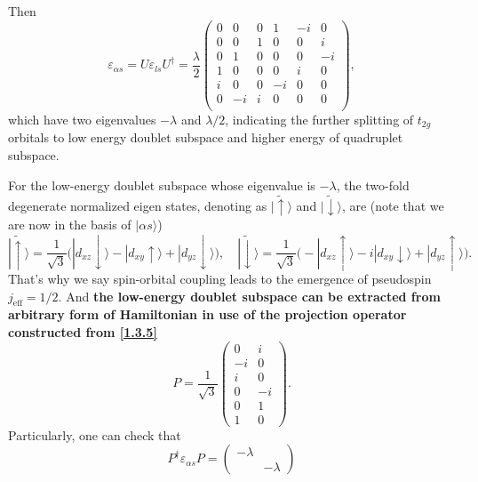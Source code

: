 \documentclass[10pt,nofootinbib]{revtex4}
\begin{document}
		Then
		\begin{equation}\label{1.3.4}
			\varepsilon_{\alpha s}=U \varepsilon_{ls} U^\dagger=
				\dfrac{\lambda}{2}\left(\begin{array}{cccccc}
					 0 & 0 & 0 & 1 & -i & 0 \\
					 0 & 0 & 1 & 0 & 0 & i \\
					 0 & 1 & 0 & 0 & 0 & -i \\
					 1 & 0 & 0 & 0 & i & 0 \\
					 i & 0 & 0 & -i & 0 & 0 \\
					 0 & -i & i & 0 & 0 & 0 \\
				\end{array}\right),
		\end{equation}
		which have two eigenvalues  $-\lambda$ and $\lambda/2$, indicating the further splitting of $t_{2g}$ orbitals to low energy doublet subspace and higher energy of quadruplet subspace.\par
		For the low-energy doublet subspace whose eigenvalue is $-\lambda$, the two-fold degenerate normalized eigen states, denoting as $|\widetilde{\uparrow}\rangle $ and $|\widetilde{\downarrow}\rangle $, are (note that we are now in the basis of $|\alpha s\rangle$)
		\begin{equation}\label{1.3.5}
			|\widetilde{\uparrow}\rangle=\dfrac{1}{\sqrt{3}}\bigg(|d_{xz}\downarrow\rangle-|d_{xy}\uparrow\rangle+|d_{yz}\downarrow\rangle\bigg),\quad|\widetilde{\downarrow}\rangle=\dfrac{1}{\sqrt{3}}\bigg(-|d_{xz}\uparrow\rangle-i|d_{xy}\downarrow\rangle+|d_{yz}\uparrow\rangle\bigg).
		\end{equation}
		That's why we say spin-orbital coupling leads to the emergence of pseudospin $j_{\text{eff}}=1/2$. And {\color{red}\textbf{the low-energy doublet subspace can be extracted from arbitrary form of Hamiltonian in use of the projection operator constructed from \eqref{1.3.5}}}
		\begin{equation}\label{1.3.6}
			P=\dfrac{1}{\sqrt{3}}\left(\begin{array}{cc}
				0 & i\\
				-i & 0\\
				i & 0\\
				0 & -i\\
				0 & 1\\
				1 & 0
			\end{array}\right).
		\end{equation}
		Particularly, one can check that
		\begin{equation*}
			P^\dagger \varepsilon_{\alpha s}P=\left(\begin{array}{cc}
				-\lambda & \\
				& -\lambda
			\end{array}\right) 
		\end{equation*}
\end{document}
